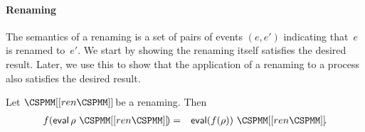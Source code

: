 \paragraph{Renaming}

The semantics of a renaming is a set of pairs of events $(e,e')$ indicating
that~$e$ is renamed to~$e'$.  
We start by showing the renaming itself satisfies the desired result.  Later,
we use this to show that the application of a renaming to a process also
satisfies the desired result.  
%
\begin{lemma}
\label{lem:eval-renaming}
Let $\rename{ren}$ be a renaming.  Then 
\begin{eqnarray*}
f(\eval \rho~\rename{ren}) & = & \eval (f(\rho))~ \rename{ren}.
\end{eqnarray*}
\end{lemma}
%
